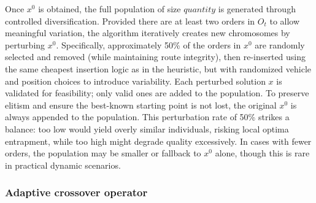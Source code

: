 \documentclass[]{interact}
\begin{document}
Once $x^0$ is obtained, the full population of size $quantity$ is generated through controlled diversification. Provided there are at least two orders in $O_t$ to allow meaningful variation, the algorithm iteratively creates new chromosomes by perturbing $x^0$. Specifically, approximately 50\% of the orders in $x^0$ are randomly selected and removed (while maintaining route integrity), then re-inserted using the same cheapest insertion logic as in the heuristic, but with randomized vehicle and position choices to introduce variability. Each perturbed solution $x$ is validated for feasibility; only valid ones are added to the population. To preserve elitism and ensure the best-known starting point is not lost, the original $x^0$ is always appended to the population. This perturbation rate of 50\% strikes a balance: too low would yield overly similar individuals, risking local optima entrapment, while too high might degrade quality excessively. In cases with fewer orders, the population may be smaller or fallback to $x^0$ alone, though this is rare in practical dynamic scenarios.


\subsubsection{Adaptive crossover operator}
\label{sec:adap_cross}

\end{document}
